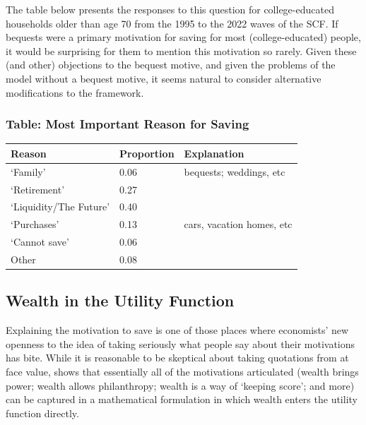 \documentclass{article}
\begin{document}
The table below presents the responses to this question for college-educated households older than age 70 from the 1995 to the 2022 waves of the SCF.
If bequests were a primary motivation for saving for most (college-educated) people, it would be surprising for them to mention this motivation so rarely.
Given these (and other) objections to the bequest motive, and given the problems of the model without a bequest motive, it seems natural to consider alternative modifications to the framework.

\subsubsection{Table: Most Important Reason for Saving}\label{most-important-reason}

\bigskip\noindent
\begin{tabular}{p{}p{}p{}}
\toprule
Reason & Proportion & Explanation \\
\hline
`Family' & 0.06 & bequests; weddings, etc \\
`Retirement' & 0.27 &  \\
`Liquidity/The Future' & 0.40 &  \\
`Purchases' & 0.13 & cars, vacation homes, etc \\
`Cannot save' & 0.06 &  \\
Other & 0.08 &  \\
\bottomrule
\end{tabular}

\bigskip\subsection{Wealth in the Utility Function}

Explaining the motivation to save is one of those places where economists' new openness to the idea of taking seriously what people say about their motivations has bite.
While it is reasonable to be skeptical about taking quotations from \cite{jaherGilded} at face value, \cite{WhyDoTheRich} shows that essentially all of the motivations articulated (wealth brings power; wealth allows philanthropy; wealth is a way of `keeping score'; and more) can be captured in a mathematical formulation in which wealth enters the utility function directly.
\end{document}
